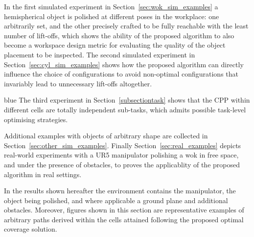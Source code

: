 \documentclass[journal]{IEEEtran}
\begin{document}
In the first simulated experiment in Section~\ref{sec:wok_sim_examples} a hemispherical object is polished at different poses in the workplace: one arbitrarily set, and the other precisely crafted to be fully reachable with the least number of lift-offs, which shows the ability of the proposed algorithm to also become a workspace design metric for evaluating the quality of the object placement to be inspected. 
The second simulated experiment in Section~\ref{sec:cyl_sim_examples} shows how the proposed algorithm can directly influence the choice of configurations 
to avoid non-optimal configurations that invariably lead to unnecessary lift-offs altogether.
\begin{color}{blue}
The third experiment in Section~\ref{subsectiontask} shows that the CPP within different cells are totally independent sub-tasks, which admits possible task-level optimising strategies. 
\end{color}
Additional examples with objects of arbitrary shape are collected in Section~\ref{sec:other_sim_examples}.
Finally Section~\ref{sec:real_examples} depicts real-world experiments with a UR5 manipulator 
polishing a wok 
in free space, and under the presence of obstacles, to proves the applicablity of the proposed algorithm in real settings. 


In the results shown hereafter 
the environment contains the manipulator, the object being polished, and where applicable a ground plane and additional obstacles. 
Moreover, figures shown in this section are representative examples of arbitrary paths derived within the cells attained following the proposed optimal coverage solution. 
\end{document}
